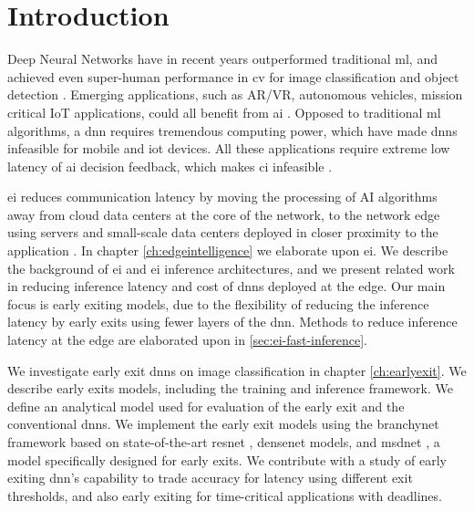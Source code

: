 
\hypertarget{introduction}{%
	\chapter{Introduction}\label{ch:introduction}}

Deep Neural Networks have in recent years outperformed traditional \gls{ml}, and achieved even super-human performance in \gls{cv} for image classification and object detection \cite{russakovsky_imagenet_2015}. Emerging applications, such as AR/VR, autonomous vehicles, mission critical IoT applications, could all benefit from \gls{ai} \cite{pettey_immersive_2018}. Opposed to traditional \gls{ml} algorithms, a \gls{dnn} requires tremendous computing power, which have made \gls{dnn}s infeasible for mobile and \gls{iot} devices. All these applications require extreme low latency of \gls{ai} decision feedback, which makes \gls{ci} infeasible \cite{zhou_edge_2019}. 

\acrlong{ei} reduces communication latency by moving the processing of AI algorithms away from cloud data centers at the core of the network, to the network edge using servers and small-scale data centers deployed in closer proximity to the application \cite{shi_edge_2016}. In chapter \ref{ch:edgeintelligence} we elaborate upon \gls{ei}. We describe the background of \gls{ei} and \gls{ei} inference architectures, and we present related work in reducing inference latency and cost of \gls{dnn}s deployed at the edge. Our main focus is early exiting models, due to the flexibility of reducing the inference latency by early exits using fewer layers of the \gls{dnn}. Methods to reduce inference latency at the edge are elaborated upon in \ref{sec:ei-fast-inference}. 

We investigate early exit \gls{dnn}s on image classification in chapter \ref{ch:earlyexit}. We describe early exits models, including the training and inference framework. We define an analytical model used for evaluation of the early exit and the conventional \gls{dnn}s. We implement the early exit models using the \gls{branchynet} framework \cite{teerapittayanon_branchynet:_2016} based on state-of-the-art \gls{resnet} \cite{he_deep_2015}, \gls{densenet} \cite{huang_densely_2016} models, and \gls{msdnet} \cite{huang_multi-scale_2017}, a model specifically designed for early exits. We contribute with a study of early exiting \gls{dnn}'s capability to trade accuracy for latency using different exit thresholds, and also early exiting for time-critical applications with deadlines.

